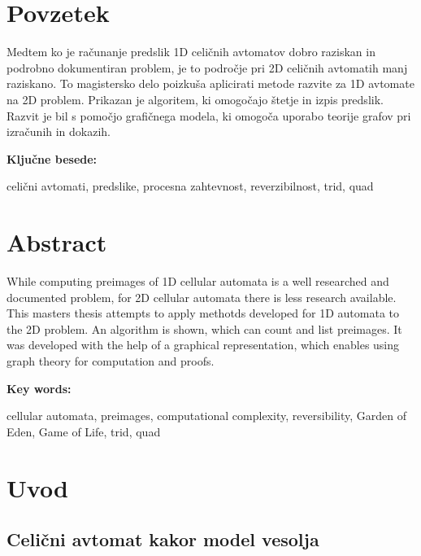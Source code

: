 \documentclass[12pt,a4paper,openany]{book}
\begin{document}
\setcounter{page}{1}

\chapter*{Povzetek}


Medtem ko je računanje predslik 1D celičnih avtomatov dobro raziskan in
podrobno dokumentiran problem, je to področje pri 2D celičnih avtomatih manj
raziskano. To magistersko delo poizkuša aplicirati metode razvite za 1D avtomate
na 2D problem. Prikazan je algoritem, ki omogočajo štetje in izpis predslik.
Razvit je bil s pomočjo grafičnega modela, ki omogoča uporabo teorije grafov pri izračunih in dokazih.

\vspace{1.3cm}
\noindent
{\large \bf Ključne besede:}

\vspace{0.5cm}
\noindent
celični avtomati, predslike, procesna zahtevnost, reverzibilnost, trid, quad


\chapter*{Abstract}


While computing preimages of 1D cellular automata is a well researched and
documented problem, for 2D cellular automata there is less research available.
This masters thesis attempts to apply methotds developed for 1D automata to the
2D problem. An algorithm is shown, which can count and list preimages.
It was developed with the help of a graphical representation, which enables using graph theory for computation and proofs.

\vspace{1.3cm}
\noindent
{\large \bf Key words:}

\vspace{0.5cm}
\noindent
cellular automata, preimages, computational complexity, reversibility, Garden of Eden, Game of Life, trid, quad



\chapter{Uvod}

\section{Celični avtomat kakor model vesolja}
\end{document}
